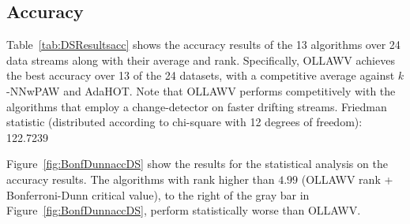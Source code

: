 \documentclass[reqno]{vcuthesis}
\numberwithin{equation}{chapter}
\begin{document}
\subsection{Accuracy}
Table~\ref{tab:DSResultsacc} shows the accuracy results of the 13 algorithms over 24 data streams along with their average and rank. %
Specifically, OLLAWV achieves the best accuracy over 13 of the 24 datasets, with a competitive average against $k$-NNwPAW and AdaHOT. Note that OLLAWV performs competitively with the algorithms that employ a change-detector on faster drifting streams. Friedman statistic (distributed according to chi-square with 12 degrees of freedom): 122.7239

Figure~\ref{fig:BonfDunnaccDS} show the results for the statistical analysis on the accuracy results. The algorithms with rank higher than $4.99$ (OLLAWV rank + Bonferroni-Dunn critical value), to the right of the gray bar in Figure~\ref{fig:BonfDunnaccDS}, perform statistically worse than OLLAWV. 
\end{document}

